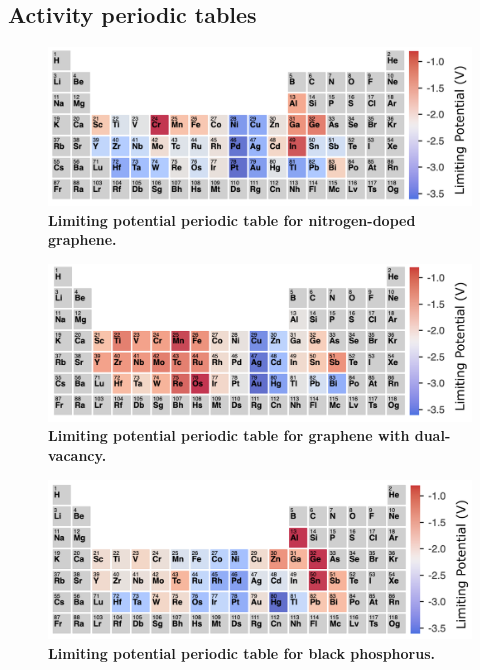 \subsection{Activity periodic tables}
\label{supp_sec2.7_ptable}

\begin{figure}[htbp]
  \centering
  \includegraphics[width=\textwidth]{supp_fig13_n-gra_ptable.png}
  \caption{\textbf{Limiting potential periodic table for nitrogen-doped graphene.}}
  \label{supp_fig13:n-gra_ptable}
\end{figure}

\begin{figure}[htbp]
  \centering
  \includegraphics[width=\textwidth]{supp_fig14_gra-vac_ptable.png}
  \caption{\textbf{Limiting potential periodic table for graphene with dual-vacancy.}}
  \label{supp_fig14:gra-vac_ptable}
\end{figure}

\begin{figure}[htbp]
  \centering
  \includegraphics[width=\textwidth]{supp_fig15_BP_ptable.png}
  \caption{\textbf{Limiting potential periodic table for black phosphorus.}}
  \label{supp_fig15:BP_ptable}
\end{figure}

